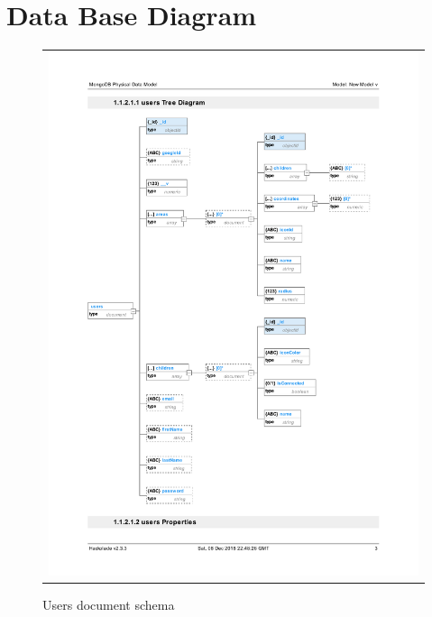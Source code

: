 \documentclass{sprawozdanie-agh}
\begin{document}
	\section{Data Base Diagram}

		\begin{figure}[H] 
			\centering
			\begin{tabular}{c}
				\includegraphics[width=.95\textwidth]{usersDB}
			\end{tabular} 
			\caption{Users document schema}
		\end{figure}
\end{document}

